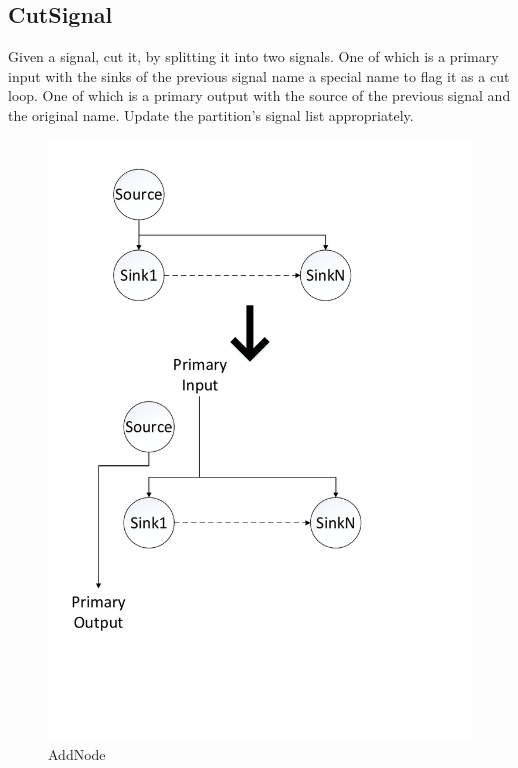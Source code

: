 \documentclass[12pt,final,oneside]{dwThesis} %
\begin{document}
   \subsection{CutSignal}\label{cutsignal}
   Given a signal, cut it, by splitting it into two signals. One of which is a primary input with the sinks of the previous signal name a special name to flag it as a cut loop. One of which is a primary output with the source of the previous signal and the original name. Update the partition's signal list appropriately.
   \begin{figure}
      \begin{center}
         \includegraphics[width=\linewidth]{images/CutSignal.pdf}
         \caption{AddNode}
         \label{imAddnode}
      \end{center}
   \end{figure}
\end{document}
